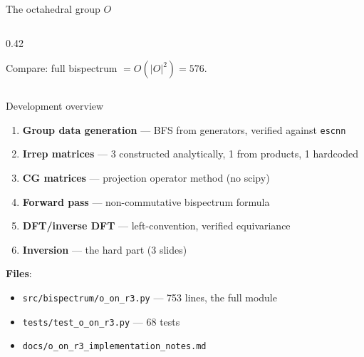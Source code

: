 \documentclass[aspectratio=169]{beamer}
\begin{document}
\begin{frame}{The octahedral group $O$}
\begin{columns}[T]
\begin{column}{0.42\textwidth}
      \bigskip

      Compare: full bispectrum $= O(|O|^2) = 576$.
    \end{column}
  \end{columns}
\end{frame}

\begin{frame}{Development overview}
  \begin{enumerate}
    \item \textbf{Group data generation} --- BFS from generators, verified against \texttt{escnn}
    \item \textbf{Irrep matrices} --- 3 constructed analytically, 1 from products, 1 hardcoded
    \item \textbf{CG matrices} --- projection operator method (no scipy)
    \item \textbf{Forward pass} --- non-commutative bispectrum formula
    \item \textbf{DFT/inverse DFT} --- left-convention, verified equivariance
    \item \textbf{Inversion} --- the hard part (3 slides)
  \end{enumerate}

  \bigskip

  \textbf{Files}:
  \begin{itemize}
    \item \texttt{src/bispectrum/o\_on\_r3.py} --- 753 lines, the full module
    \item \texttt{tests/test\_o\_on\_r3.py} --- 68 tests
    \item \texttt{docs/o\_on\_r3\_implementation\_notes.md}
  \end{itemize}
\end{frame}
\end{document}
